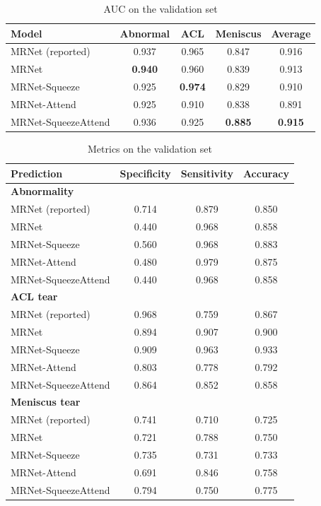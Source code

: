 \documentclass[10pt,twocolumn,letterpaper]{article}
\begin{document}
\begin{table}[bp]
\begin{center}
\begin{tabular}{|l|c|c|c||c|}
\hline
Model & Abnormal & ACL & Meniscus & Average \\
\hline\hline
MRNet (reported) & 0.937 & 0.965 & 0.847 & 0.916 \\
\hline
MRNet & \textbf{0.940} & 0.960 & 0.839 & 0.913 \\
MRNet-Squeeze & 0.925 & \textbf{0.974} & 0.829 & 0.910 \\
MRNet-Attend & 0.925 & 0.910 & 0.838  & 0.891\\
MRNet-SqueezeAttend & 0.936 & 0.925 & \textbf{0.885} & \textbf{0.915}\\
\hline
\end{tabular}
\end{center}
\caption{AUC on the validation set}
\label{tab:results}
\end{table}

\begin{table}[bp]
\begin{center}
\begin{tabular}{|l|c|c|c|}
\hline
Prediction & Specificity & Sensitivity & Accuracy \\
\hline
\multicolumn{4}{l}{\textbf{Abnormality} }\\
\hline
MRNet (reported) & 0.714 & 0.879 & 0.850 \\
MRNet & 0.440 & 0.968 & 0.858 \\
MRNet-Squeeze & 0.560 & 0.968 & 0.883 \\
MRNet-Attend & 0.480 & 0.979 & 0.875  \\
MRNet-SqueezeAttend & 0.440 & 0.968 & 0.858 \\
\hline
\multicolumn{4}{l}{\textbf{ACL tear} }\\
\hline
MRNet (reported) & 0.968 & 0.759 & 0.867 \\
MRNet & 0.894 & 0.907 & 0.900 \\
MRNet-Squeeze & 0.909 & 0.963 & 0.933 \\
MRNet-Attend & 0.803 & 0.778 &  0.792 \\
MRNet-SqueezeAttend & 0.864 & 0.852 & 0.858 \\
\hline
\multicolumn{4}{l}{\textbf{Meniscus tear} }\\
\hline
MRNet (reported) & 0.741 & 0.710 & 0.725 \\
MRNet & 0.721 & 0.788 & 0.750 \\
MRNet-Squeeze & 0.735 & 0.731 & 0.733 \\
MRNet-Attend & 0.691 & 0.846 &  0.758 \\
MRNet-SqueezeAttend & 0.794 & 0.750 & 0.775 \\
\hline
\end{tabular}
\end{center}
\caption{Metrics on the validation set}
\label{tab:results}
\end{table}
\end{document}
